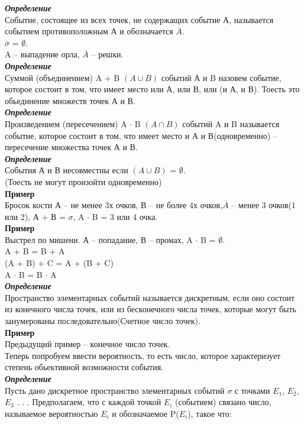 \documentclass[russian, 12pt]{article}
\begin{document}
\textit{\textbf{Определение}}\\ Событие, состоящее из всех точек, не содержащих событие А, называется событием противоположным А и обозначается $\overline{A}$.\\
$\overline{\sigma}$ = $\emptyset$.\\
A -- выпадение орла, $\overline{A}$ -- решки.\\
\textit{\textbf{Определение}}\\ Суммой (объединением)  A + B $(A \cup B)$ событий А и B назовем событие, которое состоит в том, что имеет место или А, или В, или (и А, и В). Тоесть это обьединение множеств точек А и В.\\
\textit{\textbf{Определение}}\\Произведением (пересечением) A $\cdot$ B $(A \cap B)$ событий A и B называется событие, которое состоит в том, что имеет место и А и В(одновременно) -- пересечение множества точек А и В.\\
\textit{\textbf{Определение}} \\События А и В несовместны если $(A \cup B)$ =  $\emptyset$.\\
(Тоесть не могут произойти одновременно)\\
\textbf{Пример\\}Бросок кости А -- не менее 3х очков, В -- не более 4х очков,$\overline{A}$ -- менее 3 очков(1 или 2), А + В = {$\sigma$}, A $\cdot$ B = 3 или 4 очка.\\
\textbf{Пример}\\Выстрел по мишени. А -- попадание, В -- промах,  A $\cdot$ B = $\emptyset$.\\
A + B = B + A\\
(A + B) + C = A + (B + C)\\
A $\cdot$ B = B  $\cdot$ A\\
\textit{\textbf{Определение}}\\Пространство элементарных событий называется дискретным, если оно состоит из конечного числа точек, или из бесконечного числа точек, которые могут быть занумерованы последовательно(Счетное число точек).\\
\textbf{Пример}\\Предыдущий пример -- конечное число точек.\\
Теперь попробуем ввести вероятность, то есть число, которое характеризует степень обьективной возможности события.\\
\textit{\textbf{Определение}}\\Пусть дано дискретное пространство элементарных событий {$\sigma$} с точками $E_{1}$, $E_{2}$, $E_{3}$ . . .  Предполагаем, что с каждой точкой $E_{i}$ (событием) связано число, называемое вероятностью $E_{i}$ и обозначаемое P($E_{i}$), такое что:\\ 
\end{document}
